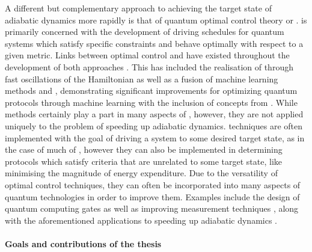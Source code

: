 A different but complementary approach to achieving the target state of adiabatic dynamics more rapidly is that of quantum optimal control theory or  \cite{glaser_training_2015, koch_quantum_2022}.  is primarily concerned with the development of driving schedules for quantum systems which satisfy specific constraints and behave optimally with respect to a given metric. Links between optimal control and  have existed throughout the development of both approaches \cite{stefanatos_frictionless_2010, stefanatos_shortcut_2021, zhang_connection_2021}. This has included the realisation of  through fast oscillations of the Hamiltonian \cite{petiziol_accelerated_2020, petiziol_fast_2018} as well as a fusion of machine learning methods and , demonstrating significant improvements for optimizing quantum protocols through machine learning with the inclusion of concepts from  \cite{bukov_reinforcement_2018, yao_reinforcement_2021, khait_optimal_2022}. While  methods certainly play a part in many aspects of , however, they are not applied uniquely to the problem of speeding up adiabatic dynamics.  techniques are often implemented with the goal of driving a system to some desired target state, as in the case of much of , however they can also be implemented in determining protocols which satisfy criteria that are unrelated to some target state, like minimising the magnitude of energy expenditure. Due to the versatility of optimal control techniques, they can often be incorporated into many aspects of quantum technologies in order to improve them. Examples include the design of quantum computing gates \cite{pelegri_high-fidelity_2022} as well as improving measurement techniques \cite{wiseman_quantum_2009}, along with the aforementioned applications to speeding up adiabatic dynamics \cite{guery-odelin_shortcuts_2019}.


\paragraph*{Goals and contributions of the thesis}

